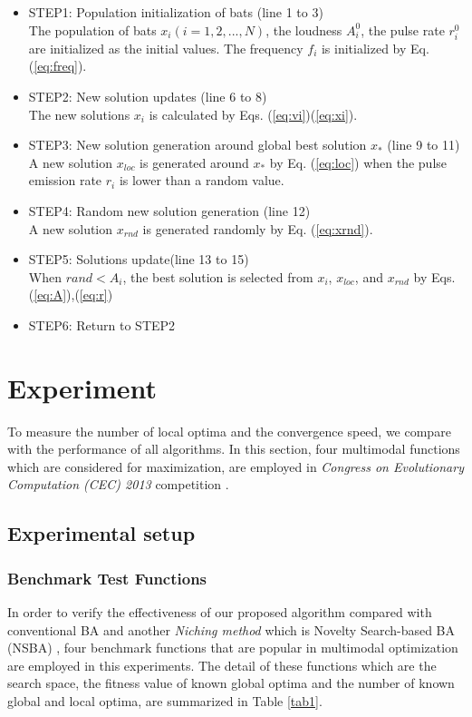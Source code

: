 \documentclass[conference]{IEEEtran}
\begin{document}
\begin{itemize}
\item STEP1: Population initialization of bats (line 1 to 3)\\
The population of bats ${x_i}(i=1, 2, ..., N)$, the loudness ${A_i^0}$, the pulse rate ${r_i^0}$ are initialized as the initial values. The frequency ${f_i}$ is initialized by Eq.(\ref{eq:freq}).
\item STEP2: New solution updates (line 6 to 8)\\
The new solutions ${x_i}$ is calculated by Eqs. (\ref{eq:vi})(\ref{eq:xi}).
\item STEP3: New solution generation around global best solution ${x_*}$ (line 9 to 11)\\
A new solution $x_{loc}$ is generated around $x_*$ by Eq. (\ref{eq:loc}) when the pulse emission rate $r_i$ is lower than a random value.
\item STEP4: Random new solution generation (line 12)\\
A new solution ${x_{rnd}}$ is generated randomly by Eq. (\ref{eq:xrnd}).  
\item STEP5: Solutions update(line 13 to 15)\\
When ${rand < A_i}$, the best solution is selected from $x_i$, ${x_{loc}}$, and ${x_{rnd}}$ by Eqs.(\ref{eq:A}),(\ref{eq:r})
\item STEP6: Return to STEP2 
\end{itemize}

\section{Experiment}
To measure the number of local optima and the convergence speed, we compare with the performance of all algorithms. In this section, four multimodal functions which are considered for maximization, are employed in \textit{Congress on Evolutionary Computation (CEC) 2013} competition \cite{cec2013}. 

\subsection{Experimental setup}
\subsubsection{Benchmark Test Functions}
In order to verify the effectiveness of our proposed algorithm compared with conventional BA and another {\it Niching method} which is Novelty Search-based BA (NSBA) \cite{NSBA}, four benchmark functions that are popular in multimodal optimization are employed in this experiments. The detail of these functions which are the search space, the fitness value of known global optima and the number of known global and local optima, are summarized in Table \ref{tab1}.
\end{document}
